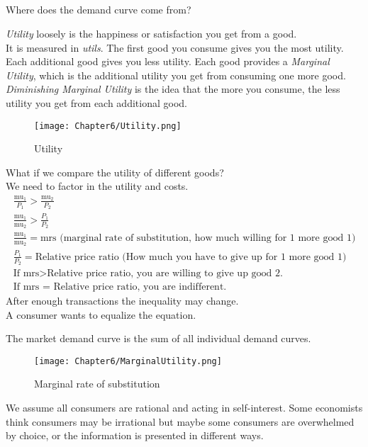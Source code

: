 \subsection{}

Where does the demand curve come from?\\
\begin{definition}
    \emph{Utility} loosely is the happiness or satisfaction you get from a good.\\
    It is measured in \emph{utils}. The first good you consume gives you the most utility.
    Each additional good gives you less utility. Each good provides a \emph{Marginal Utility}, 
    which is the additional utility you get from consuming one more good. \emph{Diminishing Marginal Utility} 
    is the idea that the more you consume, the less utility you get from each additional good.
\end{definition}
\begin{figure}[H]
    \centering
    \texttt{[image: Chapter6/Utility.png]}
    \caption{Utility}
    \label{fig:Utility}
\end{figure}
What if we compare the utility of different goods?\\
We need to factor in the utility and costs.
\begin{equation}
    \begin{gathered}
        \frac{\text{mu}_1}{P_1} > \frac{\text{mu}_2}{P_2}\\
        \frac{\text{mu}_1}{\text{mu}_2} > \frac{P_1}{P_2}\\
        \frac{\text{mu}_1}{\text{mu}_2} = \text{mrs (marginal rate of substitution, how much willing for 1 more good 1)}\\
        \frac{P_1}{P_2} = \text{Relative price ratio (How much you have to give up for 1 more good 1)}\\
        \text{If mrs} > \text{Relative price ratio, you are willing to give up good 2.}\\
        \text{If mrs = Relative price ratio, you are indifferent.}
    \end{gathered}
\end{equation}
After enough transactions the inequality may change.\\
A consumer wants to equalize the equation.
\par
The market demand curve is the sum of all individual demand curves.
\begin{figure}[H]
    \centering
    \texttt{[image: Chapter6/MarginalUtility.png]}
    \caption{Marginal rate of substitution}
    \label{fig:Marginal_rate_of_substitution}
\end{figure}
\par
We assume all consumers are rational and acting in self-interest. Some economists think consumers may be irrational but maybe some consumers are overwhelmed by choice,
or the information is presented in different ways.